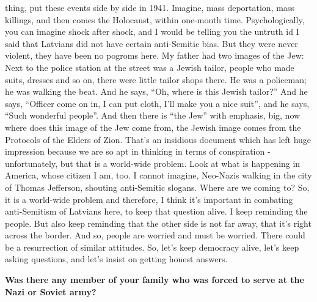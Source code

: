 thing, put these events side by side in 1941. Imagine, mass deportation, mass killings, and then comes the Holocaust, within one-month time. Psychologically, you can imagine shock after shock, and I would be telling you the untruth id I said that Latvians did not have certain anti-Semitic bias. But they were never violent, they have been no pogroms here. My father had two images of the Jew: Next to the police station at the street was a Jewish tailor, people who made suits, dresses and so on, there were little tailor shops there. He was a policeman; he was walking the beat. And he says, “Oh, where is this Jewish tailor?” And he says, “Officer come on in, I can put cloth, I’ll make you a nice suit”, and he says, “Such wonderful people”. And then there is “the Jew” with emphasis, big, now where does this image of the Jew come from, the Jewish image comes from the Protocols of the Elders of Zion. That’s an insidious document which has left huge impression because we are so apt in thinking in terms of conspiration - unfortunately, but that is a world-wide problem. Look at what is happening in America, whose citizen I am, too. I cannot imagine, Neo-Nazis walking in the city of Thomas Jefferson, shouting anti-Semitic slogans. Where are we coming to? So, it is a world-wide problem and therefore, I think it’s important in combating anti-Semitism of Latvians here, to keep that question alive. I keep reminding the people. But also keep reminding that the other side is not far away, that it’s right across the border. And so, people are worried and must be worried. There could be a resurrection of similar attitudes. So, let’s keep democracy alive, let’s keep asking questions, and let’s insist on getting honest answers.

\textbf{Was there any member of your family who was forced to serve at the Nazi or Soviet army?}

